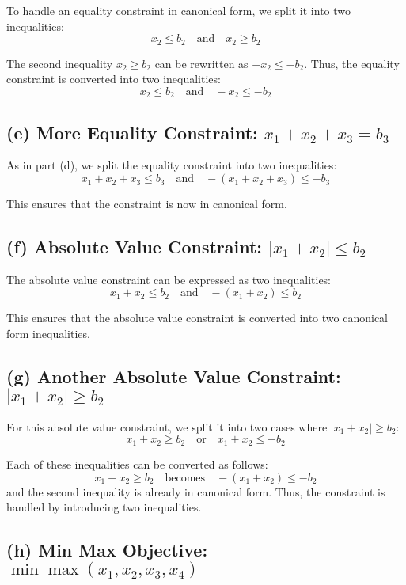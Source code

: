 \documentclass[11pt]{article}
\begin{document}
To handle an equality constraint in canonical form, we split it into two inequalities:
\[
x_2 \leq b_2 \quad \text{and} \quad x_2 \geq b_2
\]

The second inequality \( x_2 \geq b_2 \) can be rewritten as \( -x_2 \leq -b_2 \). Thus, the equality constraint is converted into two inequalities:
\[
x_2 \leq b_2 \quad \text{and} \quad -x_2 \leq -b_2
\]

\subsection*{(e) More Equality Constraint: \( x_1 + x_2 + x_3 = b_3 \)}

As in part (d), we split the equality constraint into two inequalities:
\[
x_1 + x_2 + x_3 \leq b_3 \quad \text{and} \quad -(x_1 + x_2 + x_3) \leq -b_3
\]

This ensures that the constraint is now in canonical form.

\subsection*{(f) Absolute Value Constraint: \( |x_1 + x_2| \leq b_2 \)}

The absolute value constraint can be expressed as two inequalities:
\[
x_1 + x_2 \leq b_2 \quad \text{and} \quad -(x_1 + x_2) \leq b_2
\]

This ensures that the absolute value constraint is converted into two canonical form inequalities.

\subsection*{(g) Another Absolute Value Constraint: \( |x_1 + x_2| \geq b_2 \)}

For this absolute value constraint, we split it into two cases where \( |x_1 + x_2| \geq b_2 \):
\[
x_1 + x_2 \geq b_2 \quad \text{or} \quad x_1 + x_2 \leq -b_2
\]

Each of these inequalities can be converted as follows:
\[
x_1 + x_2 \geq b_2 \quad \text{becomes} \quad -(x_1 + x_2) \leq -b_2
\]
and the second inequality is already in canonical form. Thus, the constraint is handled by introducing two inequalities.

\subsection*{(h) Min Max Objective: \( \min \max (x_1, x_2, x_3, x_4) \)}
\end{document}
